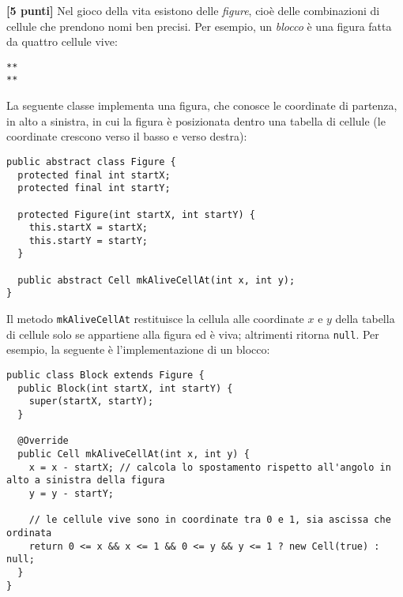 \documentclass{article}[10pt]
\newcounter{esnu}
\newenvironment{esercizio}{\medskip \noindent {\bf Esercizio\addtocounter{esnu}{1} \arabic{esnu}}}{}
\begin{document}
\begin{esercizio}
\textbf{[5 punti]}
%
Nel gioco della vita esistono delle \emph{figure}, cio\`e
delle combinazioni di cellule che prendono nomi ben precisi. Per
esempio, un \emph{blocco} \`e una figura fatta da quattro cellule vive:

{\small\begin{verbatim}
**
**
\end{verbatim}}

\noindent
La seguente classe implementa una figura, che conosce le coordinate di partenza, in alto a sinistra,
in cui la figura \`e posizionata dentro una tabella di cellule (le coordinate
crescono verso il basso e verso destra):

{\small\begin{verbatim}
public abstract class Figure {
  protected final int startX;
  protected final int startY;
  
  protected Figure(int startX, int startY) {
    this.startX = startX;
    this.startY = startY;
  }

  public abstract Cell mkAliveCellAt(int x, int y);
}
\end{verbatim}}

\noindent
Il metodo \texttt{mkAliveCellAt} restituisce la cellula alle coordinate $x$ e $y$ della
tabella di cellule solo se appartiene alla figura ed \`e viva; altrimenti ritorna \texttt{null}.
Per esempio, la seguente \`e l'implementazione di un blocco:
%
\newpage
{\small\begin{verbatim}
public class Block extends Figure {
  public Block(int startX, int startY) {
    super(startX, startY);
  }

  @Override
  public Cell mkAliveCellAt(int x, int y) {
    x = x - startX; // calcola lo spostamento rispetto all'angolo in alto a sinistra della figura
    y = y - startY;

    // le cellule vive sono in coordinate tra 0 e 1, sia ascissa che ordinata
    return 0 <= x && x <= 1 && 0 <= y && y <= 1 ? new Cell(true) : null;
  }
}
\end{verbatim}}


\end{esercizio}
\end{document}
